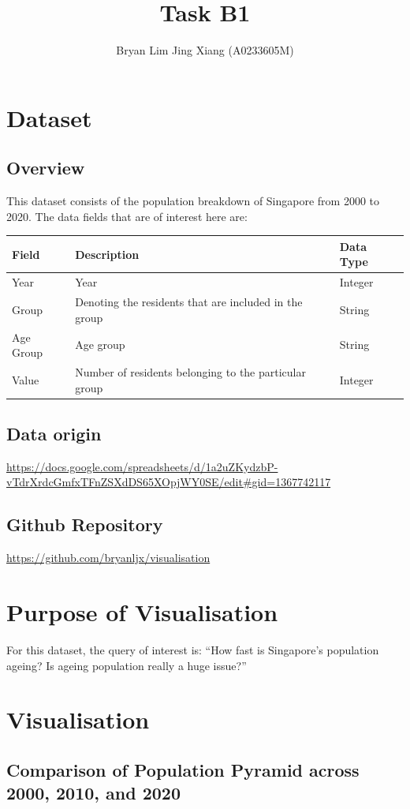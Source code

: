 \documentclass[a4paper, 11pt]{article}
\author{Bryan Lim Jing Xiang (A0233605M)}
\date{}
\title{Task B1}
\begin{document}
\maketitle
\section{Dataset}
\label{sec:org9885c41}
\subsection{Overview}
\label{sec:orgbee9f69}
This dataset consists of the population breakdown of Singapore from 2000 to 2020. The data fields that are of interest here are:

\begin{center}
\begin{tabular}{lll}
Field & Description & Data Type\\[0pt]
\hline
Year & Year & Integer\\[0pt]
Group & Denoting the residents that are included in the group & String\\[0pt]
Age Group & Age group & String\\[0pt]
Value & Number of residents belonging to the particular group & Integer\\[0pt]
\end{tabular}
\end{center}
\subsection{Data origin}
\label{sec:orge251fed}
\url{https://docs.google.com/spreadsheets/d/1a2uZKydzbP-vTdrXrdcGmfxTFnZSXdDS65XOpjWY0SE/edit\#gid=1367742117}
\subsection{Github Repository}
\label{sec:orgbd1821c}
\url{https://github.com/bryanljx/visualisation}
\section{Purpose of Visualisation}
\label{sec:org6132c3c}
For this dataset, the query of interest is: ``How fast is Singapore's population ageing? Is ageing population really a huge issue?''
\section{Visualisation}
\label{sec:org8fae193}
\subsection{Comparison of Population Pyramid across 2000, 2010, and 2020}
\label{sec:orga17dee7}
\end{document}
